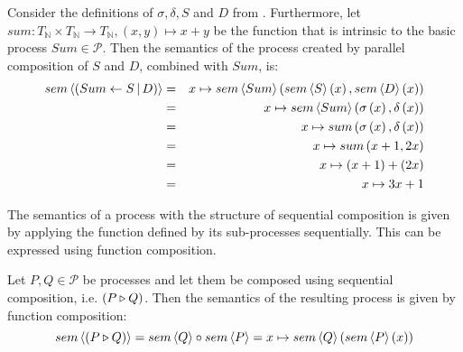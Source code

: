 \begin{example}
\label{exp:sem_parallel}
Consider the definitions of $\sigma, \delta, S$ and $D$ from . Furthermore, let $sum \colon T_\mathbb{N} \times T_\mathbb{N} \to T_\mathbb{N}, \left( x, y \right) \mapsto x + y$ be the function that is intrinsic to the basic process $Sum \in \mathcal{P}$. Then the semantics of the process created by parallel composition of $S$ and $D$, combined with $Sum$, is: 
  \begin{eqnarray*}
    sem \left\langle \left( Sum \gets S \, | \, D \right) \right\rangle & = & x \mapsto sem \left\langle Sum \right\rangle{\left( sem \left\langle S \right\rangle \left( x \right), sem \left\langle D \right\rangle \left( x \right) \right)} \\
                               & = & x \mapsto sem \left\langle Sum \right\rangle{\left( \sigma\left(x\right), \delta\left(x\right) \right)} \\
                               & = & x \mapsto sum \left( \sigma\left(x\right), \delta\left(x\right) \right) \\
                               & = & x \mapsto sum \left( x+1, 2x \right) \\
                               & = & x \mapsto \left( x+1 \right) + \left( 2x \right) \\
                               & = & x \mapsto 3x + 1
  \end{eqnarray*}
\end{example}


The semantics of a process with the structure of sequential composition is given by applying the function defined by its sub-processes sequentially. This can be expressed using function composition.
\begin{definition}
\label{def:sem_sequence}
Let $P, Q \in \mathcal{P}$ be processes and let them be composed using sequential composition, i.e. $\left( P \triangleright Q \right)$. Then the semantics of the resulting process is given by function composition:
  \begin{equation*}
    \label{eqn:sem_sequence}
    sem \left\langle \left( P \triangleright Q \right) \right\rangle = sem \left\langle Q \right\rangle \circ sem \left\langle P \right\rangle = x \mapsto sem \left\langle Q \right\rangle \left( sem \left\langle P \right\rangle \left( x \right) \right)
  \end{equation*}
  \hfill\qedsymbol
\end{definition}


